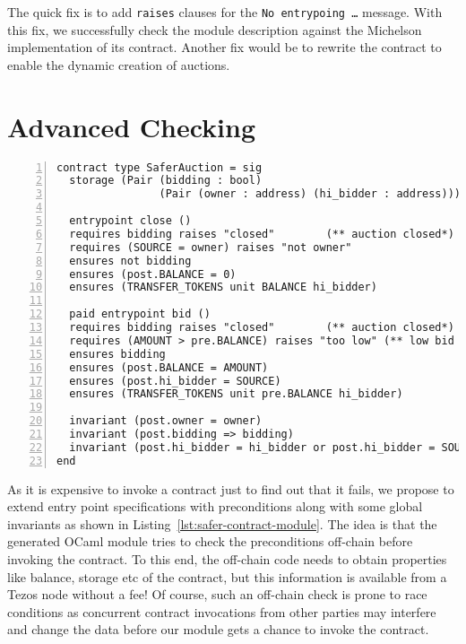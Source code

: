 \documentclass[a4paper,USenglish,american,cleveref, autoref, thm-restate]{oasics-v2021}
\begin{document}
The quick fix is to add \lstinline/raises/ clauses for the \texttt{No entrypoing \dots}
message. With this fix, we successfully check the module description against the Michelson
implementation of its contract. Another fix would be to rewrite the contract to enable the
dynamic creation of auctions.

\section{Advanced Checking}
\label{sec:advanced-checking}
\begin{lstlisting}[float,captionpos=b,caption={Enhanced contract module},label={lst:safer-contract-module},numbers=left]
contract type SaferAuction = sig
  storage (Pair (bidding : bool) 
                (Pair (owner : address) (hi_bidder : address)))

  entrypoint close ()
  requires bidding raises "closed"        (** auction closed*)
  requires (SOURCE = owner) raises "not owner"
  ensures not bidding
  ensures (post.BALANCE = 0)
  ensures (TRANSFER_TOKENS unit BALANCE hi_bidder)

  paid entrypoint bid () 
  requires bidding raises "closed"        (** auction closed*)
  requires (AMOUNT > pre.BALANCE) raises "too low" (** low bid *)
  ensures bidding 
  ensures (post.BALANCE = AMOUNT)
  ensures (post.hi_bidder = SOURCE)
  ensures (TRANSFER_TOKENS unit pre.BALANCE hi_bidder)

  invariant (post.owner = owner)
  invariant (post.bidding => bidding)
  invariant (post.hi_bidder = hi_bidder or post.hi_bidder = SOURCE)
end
\end{lstlisting}

As it is expensive to invoke a contract just to find out that it
fails, we propose to extend entry point specifications with
preconditions along with some global invariants as shown in Listing~\ref{lst:safer-contract-module}. The
idea is that the generated OCaml module tries to check the
preconditions off-chain before invoking the contract. To this end, the
off-chain code needs to obtain properties like balance, storage etc of the
contract, but this information is available from a Tezos node without a fee! Of course, such an
off-chain check is prone to race conditions as concurrent contract invocations from other parties
may interfere and change the data before our module gets a chance to invoke the contract.
\end{document}
